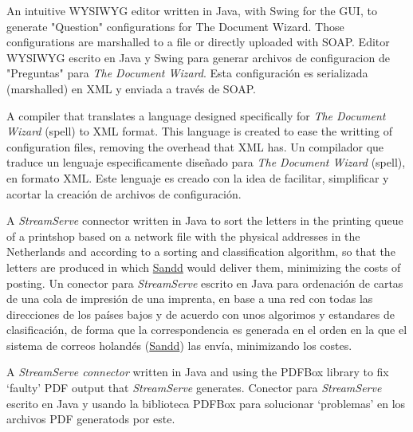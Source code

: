 
    {\ml
    {An intuitive WYSIWYG editor written in Java, with Swing for the GUI, to
    generate "Question" configurations for The Document Wizard.  Those
    configurations are marshalled to a file or directly uploaded with SOAP.}
    {Editor WYSIWYG escrito en Java y Swing para generar archivos de
    configuracion de "Preguntas" para \textit{The Document Wizard}. Esta
    configuración es serializada (marshalled) en XML y enviada a través de
    SOAP.}
}


    {\ml
    {A compiler that translates a language designed specifically for
    \textit{The Document Wizard} (spell) to XML format. This language is
    created to ease the writting of configuration files, removing the overhead
    that XML has.}
    {Un compilador que traduce un lenguaje especificamente diseñado para
    \textit{The Document Wizard} (spell), en formato XML. Este lenguaje es
    creado con la idea de facilitar, simplificar y acortar la creación de
    archivos de configuración.}
}


    {\ml
    {A \textit{StreamServe} connector written in Java to sort the letters in the
    printing queue of a printshop based on a network file with the physical
    addresses in the Netherlands and according to a sorting and classification
    algorithm, so that the letters are produced in which
    \href{https://sandd.nl/}{Sandd} would deliver them, minimizing the costs of
    posting.}
    {Un conector para \textit{StreamServe} escrito en Java para ordenación de
    cartas de una cola de impresión de una imprenta, en base a una red con
    todas las direcciones de los países bajos y de acuerdo con unos algorimos y
    estandares de clasificación, de forma que la correspondencia es generada en
    el orden en la que el sistema de correos holandés
    (\href{https://sandd.nl/}{Sandd}) las envía, minimizando los costes.}
}


    {\ml
    {A \textit{StreamServe connector} written in Java and using the PDFBox
    library to fix `faulty' PDF output that \textit{StreamServe} generates.}
    {Conector para \textit{StreamServe} escrito en Java y usando la biblioteca
    PDFBox para solucionar `problemas' en los archivos PDF generatods por
    este.}
}

